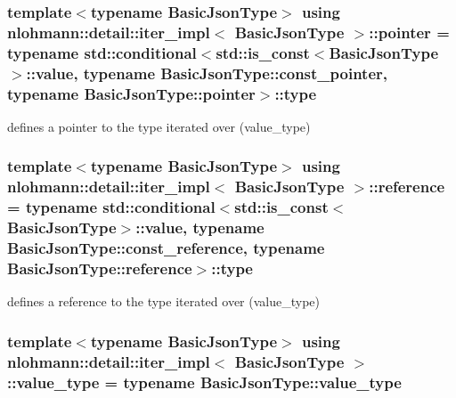 \subsubsection[{\texorpdfstring{pointer}{pointer}}]{\setlength{\rightskip}{0pt plus 5cm}template$<$typename Basic\+Json\+Type$>$ using {\bf nlohmann\+::detail\+::iter\+\_\+impl}$<$ Basic\+Json\+Type $>$\+::{\bf pointer} =  typename std\+::conditional$<$std\+::is\+\_\+const$<$Basic\+Json\+Type$>$\+::{\bf value}, typename Basic\+Json\+Type\+::const\+\_\+pointer, typename Basic\+Json\+Type\+::pointer$>$\+::type}\hypertarget{classnlohmann_1_1detail_1_1iter__impl_a69e52f890ce8c556fd68ce109e24b360}{}\label{classnlohmann_1_1detail_1_1iter__impl_a69e52f890ce8c556fd68ce109e24b360}


defines a pointer to the type iterated over (value\+\_\+type) 

\subsubsection[{\texorpdfstring{reference}{reference}}]{\setlength{\rightskip}{0pt plus 5cm}template$<$typename Basic\+Json\+Type$>$ using {\bf nlohmann\+::detail\+::iter\+\_\+impl}$<$ Basic\+Json\+Type $>$\+::{\bf reference} =  typename std\+::conditional$<$std\+::is\+\_\+const$<$Basic\+Json\+Type$>$\+::{\bf value}, typename Basic\+Json\+Type\+::const\+\_\+reference, typename Basic\+Json\+Type\+::reference$>$\+::type}\hypertarget{classnlohmann_1_1detail_1_1iter__impl_a5be8001be099c6b82310f4d387b953ce}{}\label{classnlohmann_1_1detail_1_1iter__impl_a5be8001be099c6b82310f4d387b953ce}


defines a reference to the type iterated over (value\+\_\+type) 

\subsubsection[{\texorpdfstring{value\+\_\+type}{value_type}}]{\setlength{\rightskip}{0pt plus 5cm}template$<$typename Basic\+Json\+Type$>$ using {\bf nlohmann\+::detail\+::iter\+\_\+impl}$<$ Basic\+Json\+Type $>$\+::{\bf value\+\_\+type} =  typename Basic\+Json\+Type\+::value\+\_\+type}\hypertarget{classnlohmann_1_1detail_1_1iter__impl_ab35586a44f2222272c5346baa3013f67}{}\label{classnlohmann_1_1detail_1_1iter__impl_ab35586a44f2222272c5346baa3013f67}


